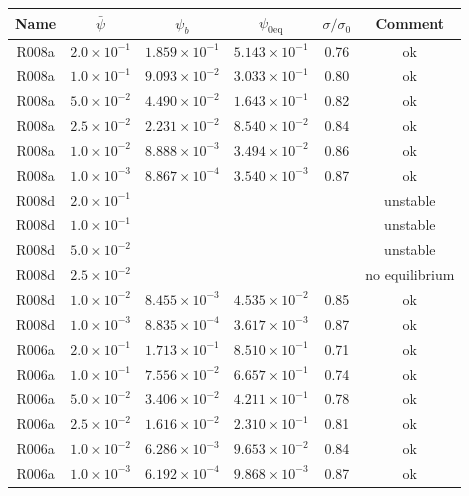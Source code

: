 \begin{table}
\begin{center}
\begin{tabular}{|c|c|c|c|c|c|}
\hline
Name & $\bar{\psi}$ & $\psi_b$ & $\psi_{0\mathrm{eq}}$
     & $\sigma / \sigma_0$  & Comment \\
\hline
R008a &  $2.0\times 10^{-1}$ & $1.859\times 10^{-1}$ & $5.143\times10^{-1}$
      & 0.76 & ok\\
R008a &  $1.0\times 10^{-1}$ & $9.093\times 10^{-2}$ & $3.033\times10^{-1}$
      & 0.80 & ok\\
R008a &  $5.0\times 10^{-2}$ & $4.490\times 10^{-2}$ & $1.643\times10^{-1}$
      & 0.82 & ok\\
R008a &  $2.5\times 10^{-2}$ & $2.231\times 10^{-2}$ & $8.540\times10^{-2}$
      & 0.84 & ok\\
R008a &  $1.0\times 10^{-2}$ & $8.888\times 10^{-3}$ & $3.494\times10^{-2}$
      & 0.86 & ok\\
R008a &  $1.0\times 10^{-3}$ & $8.867\times 10^{-4}$ & $3.540\times10^{-3}$
      & 0.87 & ok\\
\hline
R008d &  $2.0\times 10^{-1}$ &  &  &  & unstable \\
R008d &  $1.0\times 10^{-1}$ &  &  &  & unstable \\
R008d &  $5.0\times 10^{-2}$ &  &  &  & unstable \\
R008d &  $2.5\times 10^{-2}$ &  &  &  & no equilibrium \\
R008d &  $1.0\times 10^{-2}$ & $8.455\times 10^{-3}$ & $4.535\times10^{-2}$
      & 0.85 & ok \\
R008d &  $1.0\times 10^{-3}$ & $8.835\times 10^{-4}$ & $3.617\times10^{-3}$
      & 0.87 & ok \\
\hline
R006a &  $2.0\times 10^{-1}$ & $1.713\times 10^{-1}$ & $8.510\times10^{-1}$
      & 0.71 & ok\\
R006a &  $1.0\times 10^{-1}$ & $7.556\times 10^{-2}$ & $6.657\times10^{-1}$
      & 0.74 & ok\\
R006a &  $5.0\times 10^{-2}$ & $3.406\times 10^{-2}$ & $4.211\times10^{-1}$
      & 0.78 & ok\\
R006a &  $2.5\times 10^{-2}$ & $1.616\times 10^{-2}$ & $2.310\times10^{-1}$
      & 0.81 & ok\\
R006a &  $1.0\times 10^{-2}$ & $6.286\times 10^{-3}$ & $9.653\times10^{-2}$
      & 0.84 & ok\\
R006a &  $1.0\times 10^{-3}$ & $6.192\times 10^{-4}$ & $9.868\times10^{-3}$
      & 0.87 & ok\\

\end{tabular}
\end{center}
\end{table}
